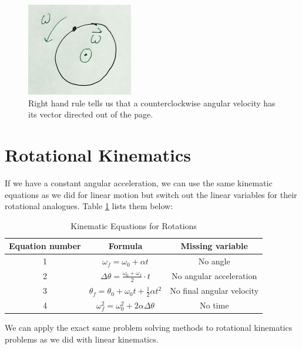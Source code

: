 \documentclass[12pt]{book}
\begin{document}
\begin{figure}[H]
\centering
\includegraphics[scale=0.8]{omega_vector.png}
\caption{Right hand rule tells us that a counterclockwise angular velocity has its vector directed out of the page.}
\label{omegavector}
\end{figure}

\section{Rotational Kinematics}

If we have a constant angular acceleration, we can use the same kinematic equations as we did for linear motion but switch out the linear variables for their rotational analogues. Table \ref{kmrot} lists them below:

\begin{table}[H]
\large
\centering
\caption{Kinematic Equations for Rotations}
\label{kmrot}
\begin{tabular}{| c | c | c |}
	\hline
	Equation number & Formula & Missing variable \\
	\hline
	1 & $\omega_f = \omega_0 + \alpha t$ & No angle \\[5pt] \hline
	2 & $\Delta \theta = \frac{\omega_0 + \omega_f}{2} \cdot t$ & No angular acceleration \\[5pt] \hline
	3 & $\theta_f = \theta_0 + \omega_0 t + \frac{1}{2} \alpha t^2$ & No final angular velocity \\[5pt] \hline
	4 & $\omega_f^2 = \omega_0^2 + 2 \alpha \Delta \theta$ & No time \\[5pt]
	\hline
\end{tabular}
\end{table}

We can apply the exact same problem solving methods to rotational kinematics problems as we did with linear kinematics.
\end{document}
